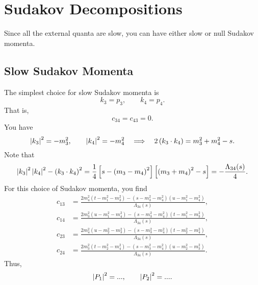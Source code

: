 \section{Sudakov Decompositions}
Since all the external quanta are slow, you can have either slow or null Sudakov momenta.
\subsection{Slow Sudakov Momenta}
The simplest choice for slow Sudakov momenta is
\begin{equation}
	k_{3} = p_{3}, \qquad k_{4} = p_{4}.
\end{equation}
That is,
\begin{equation}
	c_{34} = c_{43} = 0.
\end{equation}
You have
\begin{equation}
	\left\lvert k_{3} \right\rvert^{2} = -m_{3}^{2}, \qquad \left\lvert k_{4} \right\rvert^{2} = -m_{4}^{2} \quad \Longrightarrow \quad 2\left( k_{3} \cdot k_{4} \right) = m_{3}^{2} + m_{4}^{2} - s.
\end{equation}
Note that
\begin{equation}
	\left\lvert k_{3} \right\rvert^{2} \left\lvert k_{4} \right\rvert^{2} - \left( k_{3} \cdot k_{4} \right)^{2} = \frac{1}{4} \left[ s - \left( m_{3} - m_{4} \right)^{2} \right] \left[ \left( m_{3} + m_{4} \right)^{2} - s \right] = - \frac{\Lambda_{34}(s)}{4}.
\end{equation}
For this choice of Sudakov momenta, you find
\begin{align}
	c_{13} &= \frac{2 m_{4}^{2} \left(t - m_{1}^{2} - m_{3}^{2} \right) - \left(s - m_{3}^{2} - m_{4}^{2} \right) \left(u - m_{1}^{2} - m_{4}^{2} \right) }{\Lambda_{34}(s)}, \\
	c_{14} &= \frac{2 m_{3}^{2} \left(u - m_{1}^{2} - m_{4}^{2} \right) - \left(s - m_{3}^{2} - m_{4}^{2} \right) \left(t - m_{1}^{2} - m_{3}^{2} \right) }{\Lambda_{34}(s)}, \\
	c_{23} &= \frac{2 m_{4}^{2} \left(u - m_{2}^{2} - m_{3}^{2} \right) - \left(s - m_{3}^{2} - m_{4}^{2} \right) \left(t - m_{2}^{2} - m_{4}^{2} \right) }{\Lambda_{34}(s)}, \\
	c_{24} &= \frac{2 m_{3}^{2} \left(t - m_{2}^{2} - m_{4}^{2} \right) - \left(s - m_{3}^{2} - m_{4}^{2} \right) \left(u - m_{2}^{2} - m_{3}^{2} \right) }{\Lambda_{34}(s)}.
\end{align}
Thus,
\begin{equation}
	\left\lvert P_{1} \right\rvert^{2} = ..., \qquad \left\lvert P_{2} \right\rvert^{2} = ....
\end{equation}
